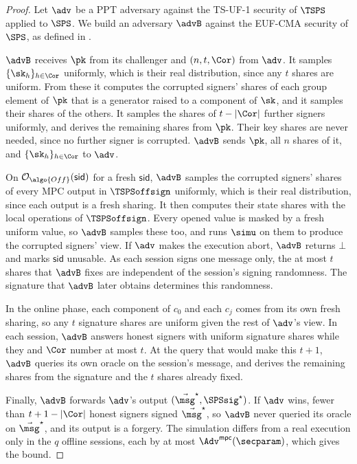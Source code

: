 \begin{proof}

  Let $\adv$ be a PPT adversary against the TS-UF-1 security of $\TSPS$
applied to $\SPS$. We build an adversary $\advB$ against the EUF-CMA security
of $\SPS$, as defined in .

  $\advB$ receives $\pk$ from its challenger and $(n, t, \Cor)$ from $\adv$. It
samples $\{\sk_h\}_{h \in \Cor}$ uniformly, which is their real distribution,
since any $t$ shares are uniform. From these it computes the corrupted signers'
shares of each group element of $\pk$ that is a generator raised to a component
of $\sk$, and it samples their shares of the others. It samples the shares of
$t - |\Cor|$ further signers uniformly, and derives the remaining shares from
$\pk$. Their key shares are never needed, since no further signer is corrupted.
$\advB$ sends $\pk$, all $n$ shares of it, and $\{\sk_h\}_{h \in \Cor}$ to
$\adv$.

  On $\mathcal{O}_{\algo{Off}}(\mathsf{sid})$ for a fresh $\mathsf{sid}$, $\advB$
samples the corrupted signers' shares of every MPC output in $\TSPSoffsign$
uniformly, which is their real distribution, since each output is a fresh
sharing. It then computes their state shares with the local operations of
$\TSPSoffsign$. Every opened value is masked by a fresh uniform value, so
$\advB$ samples these too, and runs $\simu$ on them to produce the corrupted
signers' view. If $\adv$ makes the execution abort, $\advB$ returns $\bot$ and
marks $\mathsf{sid}$ unusable. As each session signs one message only, the at
most $t$ shares that $\advB$ fixes are independent of the session's signing
randomness. The signature that $\advB$ later obtains determines this randomness.

  In the online phase, each component of $c_0$ and each $c_j$ comes from its
own fresh sharing, so any $t$ signature shares are uniform given the rest of
$\adv$'s view. In each session, $\advB$ answers honest signers with uniform
signature shares while they and $\Cor$ number at most $t$. At the query that
would make this $t+1$, $\advB$ queries its own oracle on the session's message,
and derives the remaining shares from the signature and the $t$ shares already
fixed.

  Finally, $\advB$ forwards $\adv$'s output $(\vec{\msg}^\star, \SPSsig^\star)$.
If $\adv$ wins, fewer than $t + 1 - |\Cor|$ honest signers signed
$\vec{\msg}^\star$, so $\advB$ never queried its oracle on $\vec{\msg}^\star$,
and its output is a forgery. The simulation differs from a real execution only
in the $q$ offline sessions, each by at most $\Adv^{\mathsf{mpc}}(\secparam)$,
which gives the bound.

\end{proof}

